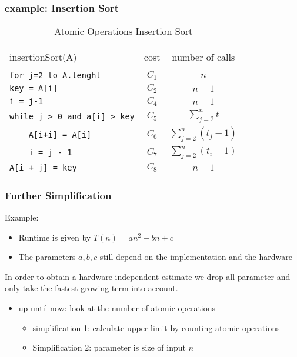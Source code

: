 \documentclass[a4paper]{article}
\begin{document}
\subsubsection{example: Insertion Sort}
\begin{table}[H]
    \centering
    \caption{Atomic Operations Insertion Sort}
    \label{tab:insertion}
    \begin{tabular}{lcc}
        \toprule \\
        insertionSort(A) & cost & number of calls \\
        \midrule \\
        \verb#for j=2 to A.lenght# & $ C_1 $ & $ n $ \\
        \verb#key = A[i]# & $ C_2 $ & $ n-1 $ \\
        \verb#i = j-1# & $ C_4 $ & $ n-1 $ \\
        \verb#while j > 0 and a[i] > key# & $ C_5 $ & $ \sum_{j=2}^{n} t $ \\
        \verb#    A[i+i] = A[i]# & $ C_6 $ & $ \sum_{j=2}^{n} (t_j -1) $ \\
        \verb#    i = j - 1# & $ C_7 $ & $ \sum_{j=2}^{n} (t_i -1) $ \\
        \verb#A[i + j] = key# & $ C_8 $ & $ n-1 $ \\
        \bottomrule
    \end{tabular}
\end{table}
\subsubsection{Further Simplification}
Example:
\begin{itemize}
    \item Runtime is given by $ T(n) = a n^2 + b n + c $ 
    \item The parameters $ a, b, c $ still depend on the implementation and the hardware
\end{itemize}
In order to obtain a hardware independent estimate we drop all parameter and only take the fastest growing term into account.
\begin{itemize}
    \item up until now: look at the number of atomic operations
        \begin{itemize}
            \item simplification 1: calculate upper limit by counting atomic operations
            \item Simplification 2: parameter is size of input $ n $ 
        \end{itemize}
\end{itemize}
\end{document}
